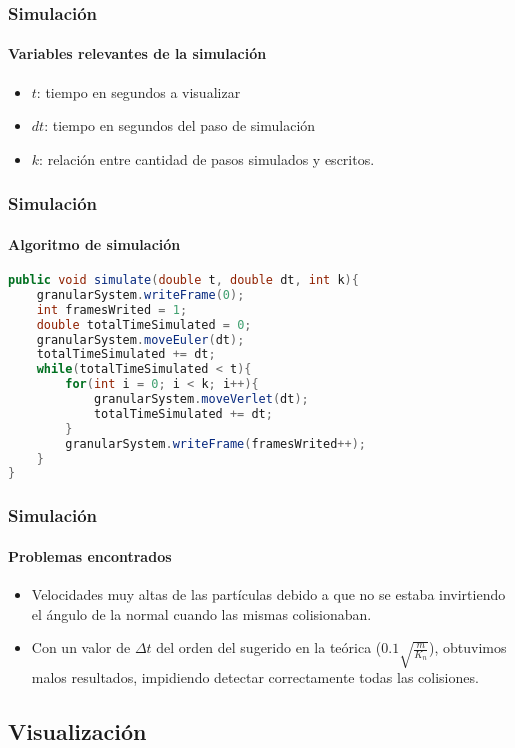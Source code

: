 \documentclass[hyperref={pdfpagelayout=SinglePage}]{beamer}
\begin{document}
\begin{frame}
\frametitle{Simulación}
\framesubtitle{Variables relevantes de la simulación}
\begin{itemize}
	\item $t$: tiempo en segundos a visualizar
	\item $dt$: tiempo en segundos del paso de simulación
	\item $k$: relación entre cantidad de pasos simulados y escritos.
\end{itemize}
\end{frame}

\begin{frame}[fragile]
\frametitle{Simulación}
\framesubtitle{Algoritmo de simulación}
\begin{lstlisting}[language=Java, caption = Algoritmo de simulación]
public void simulate(double t, double dt, int k){
	granularSystem.writeFrame(0);
    int framesWrited = 1;
    double totalTimeSimulated = 0;
    granularSystem.moveEuler(dt);
    totalTimeSimulated += dt;
    while(totalTimeSimulated < t){
		for(int i = 0; i < k; i++){
			granularSystem.moveVerlet(dt);
        	totalTimeSimulated += dt;
    	}
    	granularSystem.writeFrame(framesWrited++);
    }
}
\end{lstlisting}
\end{frame}

\begin{frame}
\frametitle{Simulación}
\framesubtitle{Problemas encontrados}
\begin{itemize}
	\item Velocidades muy altas de las partículas debido a que no se estaba invirtiendo el ángulo de la normal cuando las mismas colisionaban.
	\item Con un valor de $\Delta t$ del orden del sugerido en la teórica ($0.1 \sqrt{\frac{m}{K_{n}}}$), obtuvimos malos resultados, impidiendo detectar correctamente todas las colisiones.
\end{itemize}
\end{frame}

\subsection{Visualización}
\end{document}
